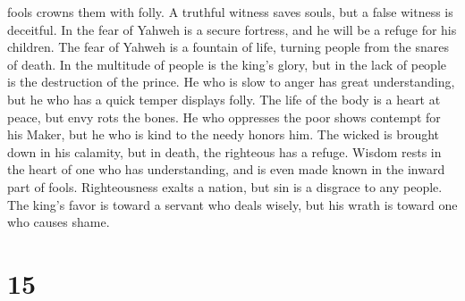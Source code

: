 fools crowns them with folly.  A truthful witness saves
souls, but a false witness is deceitful.  In the fear of
Yahweh is a secure fortress, and he will be a refuge for his children.
 The fear of Yahweh is a fountain of life, turning people
from the snares of death.  In the multitude of people is
the king's glory, but in the lack of people is the destruction of the
prince.  He who is slow to anger has great understanding,
but he who has a quick temper displays folly.  The life
of the body is a heart at peace, but envy rots the bones.
 He who oppresses the poor shows contempt for his Maker,
but he who is kind to the needy honors him.  The wicked
is brought down in his calamity, but in death, the righteous has a
refuge.  Wisdom rests in the heart of one who has
understanding, and is even made known in the inward part of fools.
 Righteousness exalts a nation, but sin is a disgrace to
any people.  The king's favor is toward a servant who
deals wisely, but his wrath is toward one who causes shame.

\hypertarget{section-14}{%
\section{15}\label{section-14}}

